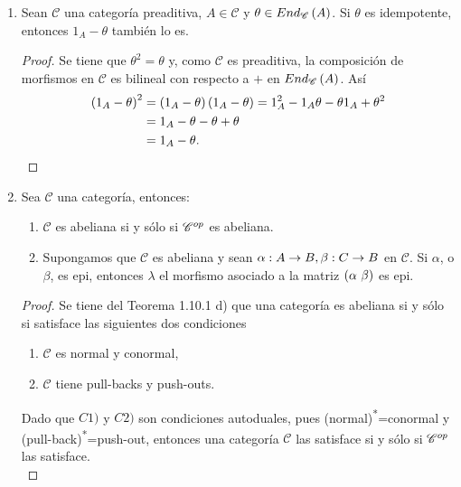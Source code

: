 \documentclass{article}
\begin{document}
\begin{enumerate}[label=\textbf{Ej \arabic*.}]
\begin{proof}
		\end{proof}
		\item Sean $\mathscr{C}$ una categoría preaditiva, $A\in\mathscr{C}$ y $\theta\in End_{\mathscr{C}}\left(A\right)$. Si $\theta$ es idempotente, entonces $1_A-\theta$ también lo es.
		\begin{proof}
			Se tiene que $\theta^2=\theta$ y, como $\mathscr{C}$ es preaditiva, la composición de morfismos  en $\mathscr{C}$ es bilineal con respecto a $+$ en $End_{\mathscr{C}}\left(A\right)$. Así
			\begin{align*}
				\left(1_A-\theta\right)^2&=\left(1_A-\theta\right)\left(1_A-\theta\right)=1_A^2-1_A\theta-\theta 1_A+\theta^2\\
				&=1_A-\theta-\theta+\theta\\
				&=1_A-\theta.
			\end{align*}
		\end{proof}
		\item Sea $\mathscr{C}$ una categoría, entonces:
		\begin{enumerate}[label=\textit{\alph*)}]
			\item $\mathscr{C}$ es abeliana si y sólo si ${\mathscr{C}}^{op}$ es abeliana.
			\item Supongamos que $\mathscr{C}$ es abeliana y sean $\catarrow{\alpha}{A}{B}{}, \catarrow{\beta}{C}{B}{}$ en $\mathscr{C}$. Si $\alpha$, o $\beta$, es epi, entonces $\lambda$ el morfismo asociado a la matriz $\left(\alpha\ \beta\right)$ es epi.
		\end{enumerate}
		\begin{proof}
			 Se tiene del Teorema 1.10.1 d) que  una categoría es abeliana si y sólo si  satisface las siguientes dos condiciones
			\begin{enumerate}[label=\textit{C\arabic*)}]
				\item $\mathscr{C}$ es normal y conormal,
				\item $\mathscr{C}$ tiene pull-backs y push-outs.
			\end{enumerate}
			Dado que $C1)$ y $C2)$ son condiciones autoduales, pues (normal)\textsuperscript{*}=conormal y (pull-back)\textsuperscript{*}=push-out, entonces una categoría $\mathscr{C}$ las satisface si y sólo si ${\mathscr{C}}^{op}$ las satisface.\\
			

\end{proof}
\end{enumerate}
\end{document}
